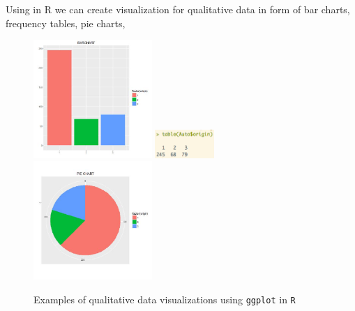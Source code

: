 \documentclass[xcolor=svgnames]{beamer} %
\begin{document}
\begin{frame}
Using in R we can create visualization for qualitative data in form of bar charts, frequency tables, pie charts,
\begin{figure}[htbp]
\begin{center}
 \includegraphics[width=0.4\textwidth]{r1}  \includegraphics[width=0.2\textwidth]{r2}
 \includegraphics[width=0.4\textwidth]{r3}
\caption{Examples of qualitative data visualizations using {\tt ggplot} in {\tt R}}
\label{default}
\end{center}
\end{figure}

\end{frame}
\end{document}
